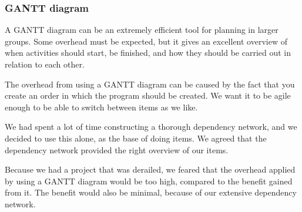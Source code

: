 \subsubsection{GANTT diagram}
A GANTT diagram can be an extremely efficient tool for planning in larger groups. Some overhead must be expected, but it gives an excellent overview of when activities should start, be finished, and how they should be carried out in relation to each other.

The overhead from using a GANTT diagram can be caused by the fact that you create an order in which the program should be created. We want it to be agile enough to be able to switch between items as we like.

We had spent a lot of time constructing a thorough dependency network, and we decided to use this alone, as the base of doing items. We agreed that the dependency network provided the right overview of our items.

Because we had a project that was derailed, we feared that the overhead applied by using a GANTT diagram would be too high, compared to the benefit gained from it. The benefit would also be minimal, because of our extensive dependency network.